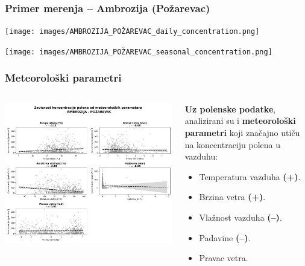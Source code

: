 \begin{frame}
    \frametitle{Primer merenja – Ambrozija (Požarevac)}

    \begin{center}
        \texttt{[image: images/AMBROZIJA\_POŽAREVAC\_daily\_concentration.png]}

        \texttt{[image: images/AMBROZIJA\_POŽAREVAC\_seasonal\_concentration.png]}
    \end{center}

\end{frame}


\begin{frame}
    \frametitle{Meteorološki parametri}

    \begin{columns}[c]
        \begin{column}{0.55\textwidth}
            \centering
            \includegraphics[width=\textwidth]{images/meteo.png}
        \end{column}

        \begin{column}{0.43\textwidth}
            \small
            \textbf{Uz polenske podatke}, analizirani su i \textbf{meteorološki parametri} 
            koji značajno utiču na koncentraciju polena u vazduhu:
            \vspace{0.2cm}
            \begin{itemize}
                \item Temperatura vazduha \textbf{(+)}.
                \item Brzina vetra \textbf{(+)}.
                \item Vlažnost vazduha \textbf{(–)}.
                \item Padavine \textbf{(–)}.
                \item Pravac vetra.
            \end{itemize}
        \end{column}
    \end{columns}

\end{frame}





